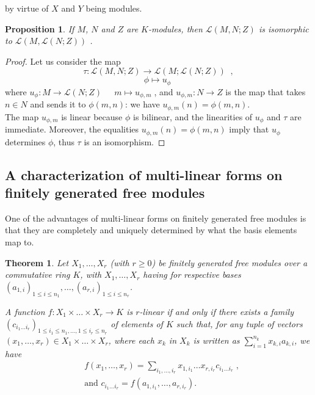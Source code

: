 \documentclass{report}
\newtheorem{thrm}{Theorem}
\newtheorem{prop}{Proposition}
\theoremstyle{definition}
\theoremstyle{remark}
\begin{document}
by virtue of $X$ and $Y$ being modules.
\begin{prop}\label{L(M,N;R) iso L(M;L(N;R)}
    If $M$, $N$ and $Z$ are $K$-modules, then $\mathcal{L}(M,N;Z)$ is isomorphic to $\mathcal{L}(M,\mathcal{L}(N;Z))$ .
\end{prop}

\begin{proof}
    Let us consider the map 
        $$\tau: \mathcal{L}(M,N;Z) \longrightarrow \mathcal{L}(M;\mathcal{L}(N;Z))\;\;,$$
        $$\phi \longmapsto u_{\phi}\;$$
        where $u_{\phi}: M \longrightarrow \mathcal{L}(N;Z)\;\;$   $\;\;m \longmapsto u_{\phi,m}\;$, and $u_{\phi,m}: N \longrightarrow Z$ is the map that takes $n \in N$ and sends it to $\phi(m,n)$: we have $u_{\phi,m}(n)=\phi(m,n) $.\\
        The map $u_{\phi,m}$ is linear because $\phi$ is bilinear, and the linearities of $u_{\phi}$ and $\tau$ are immediate. Moreover, the equalities $u_{\phi,m}(n)=\phi(m,n) $ imply that $u_{\phi}$ determines $\phi$, thus $\tau$ is an isomorphism.
\end{proof}

\subsection{A characterization of multi-linear forms on finitely generated free modules}\label{subsectionStructureConstants}

One of the advantages of multi-linear forms on finitely generated free modules is that they are completely and uniquely determined by what the basis elements map to. 

\begin{thrm}
\label{thm:structure-ctes}
    Let $X_1,  \dots, X_r$ (with $r\geq 0$) be finitely generated free modules over a commutative ring $K$, with $X_1,\dots, X_r$ having for respective bases $(a_{1,i})_{1\leq i \leq n_1},\dots,(a_{r,i})_{1 \leq i \leq n_r}$. 
    
    A function $f: X_1 \times \dots \times X_r \to K$ is $r$-linear if and only if there exists a family $(c_{i_1 \dots i_r})_{1 \leq i_1 \leq n_1,\dots,1 \leq i_r \leq n_r}$ of elements of $K$ such that, for any tuple of vectors $(x_1,\dots,x_r)\in X_1 \times \dots \times X_r$, where  each $x_k$ in $X_k$ is written as $\sum_{i=1}^{n_k} x_{k,i}a_{k,i}$, we have
	\begin{equation*}
	\begin{split}
		&	f(x_1,\dots, x_r) = \sum_{i_1 , \dots, i_r} x_{1,i_1}\dots x_{r,i_r} c_{i_1 \dots i_r}\;, \\
		& \textrm{and } c_{i_1 \dots i_r} = f(a_{1,i_1},\dots,a_{r,i_r}).
	\end{split}
	\end{equation*}
\end{thrm}
\end{document}
